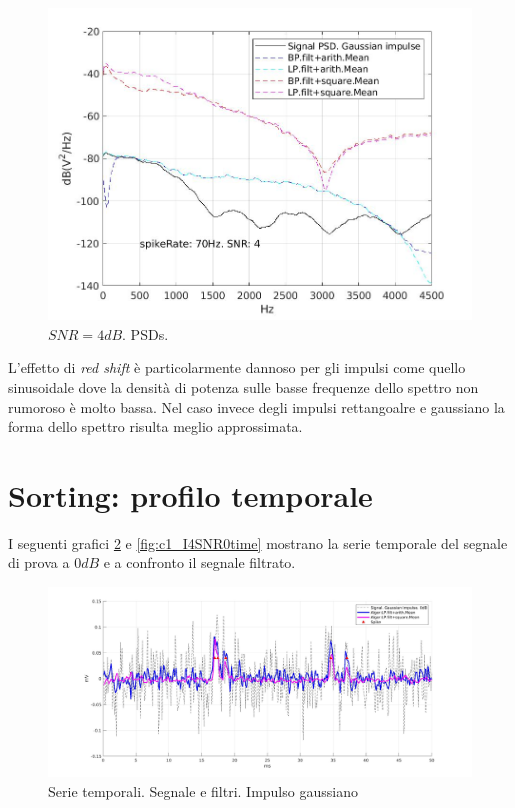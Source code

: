 \documentclass[9pt,twocolumn,twoside]{osajnl}
\begin{document}
\begin{figure}[htbp]
\centering
\includegraphics[width=1\linewidth]{results/c9_I2SNR4spec.jpg}
\caption{$SNR = 4dB$. PSDs.}
\label{fig:c9_I2SNR4spec}
\end{figure}

L'effetto di {\it red shift} è particolarmente dannoso per gli impulsi come quello sinusoidale dove la densità di potenza sulle basse frequenze dello spettro non rumoroso è molto bassa. Nel caso invece degli impulsi rettangoalre e gaussiano la forma dello spettro risulta meglio approssimata.




\section{Sorting: profilo temporale}

I seguenti grafici \ref{fig:c1_I2SNR0time} e \ref{fig:c1_I4SNR0time} mostrano la serie temporale del segnale di prova a $0dB$ e a confronto il segnale filtrato.


\begin{figure}[htbp]
\centering
\includegraphics[width=1\linewidth]{results/c1_I2SNR0time.jpg}
\caption{Serie temporali. Segnale e filtri. Impulso gaussiano}
\label{fig:c1_I2SNR0time}
\end{figure}
\end{document}

